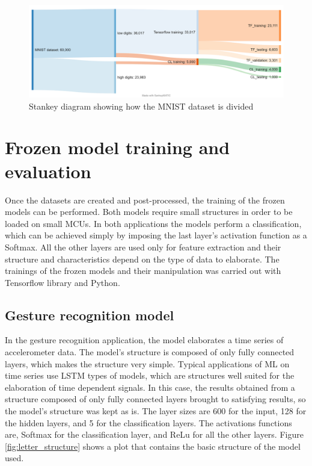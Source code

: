 \documentclass[12pt]{report}
\begin{document}
\begin{figure}[h!]
    \centering
    \includegraphics[width=140mm]{Figures/Chapter4/flow_dataset_openmv.png} 
    \caption{Stankey diagram showing how the MNIST dataset is divided}
    \label{fig:flow_dataset_openmv}    
\end{figure}

\section{Frozen model training and evaluation}
Once the datasets are created and post-processed, the training of the frozen models can be performed. Both models require small structures in order to be loaded on small MCUs. In both applications the models perform a classification, which can be achieved simply by imposing the last layer's activation function as a Softmax. All the other layers are used only for feature extraction and their structure and characteristics depend on the type of data to elaborate.
The trainings of the frozen models and their manipulation was carried out with Tensorflow library and Python.\\

\subsection{Gesture recognition model}
In the gesture recognition application, the model elaborates a time series of accelerometer data. The model's structure is composed of only fully connected layers, which makes the structure very simple. Typical applications of ML on time series use LSTM types of models, which are structures well suited for the elaboration of time dependent signals. In this case, the results obtained from a structure composed of only fully connected layers brought to satisfying results, so the model's structure was kept as is. The layer sizes are 600 for the input, 128 for the hidden layers, and 5 for the classification layers. The activations functions are, Softmax for the classification layer, and ReLu for all the other layers. Figure \ref{fig:letter_structure} shows a plot that contains the basic structure of the model used.\\
\end{document}
